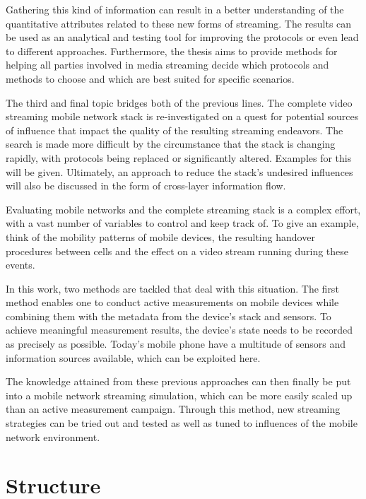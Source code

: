 Gathering this kind of information can result in a better understanding of the quantitative attributes related to these new forms of streaming. The results can be used as an analytical and testing tool for improving the protocols or even lead to different approaches. Furthermore, the thesis aims to provide methods for helping all parties involved in media streaming decide which protocols and methods to choose and which are best suited for specific scenarios.



The third and final topic bridges both of the previous lines. The complete video streaming mobile network stack is re-investigated on a quest for potential sources of influence that impact the quality of the resulting streaming endeavors. The search is made more difficult by the circumstance that the stack is changing rapidly, with protocols being replaced or significantly altered. Examples for this will be given. Ultimately, an approach to reduce the stack's undesired influences will also be discussed in the form of cross-layer information flow.

Evaluating mobile networks and the complete streaming stack is a complex effort, with a vast number of variables to control and keep track of. To give an example, think of the mobility patterns of mobile devices, the resulting handover procedures between cells and the effect on a video stream running during these events. 

In this work, two methods are tackled that deal with this situation. The first method enables one to conduct active measurements on mobile devices while combining them with the metadata from the device's stack and sensors. To achieve meaningful measurement results, the device's state needs to be recorded as precisely as possible. Today's mobile phone have a multitude of sensors and information sources available, which can be exploited here.

The knowledge attained from these previous approaches can then finally be put into a mobile network streaming simulation, which can be more easily scaled up than an active measurement campaign. Through this method, new streaming strategies can be tried out and tested as well as tuned to influences of the mobile network environment.


\section{Structure}

